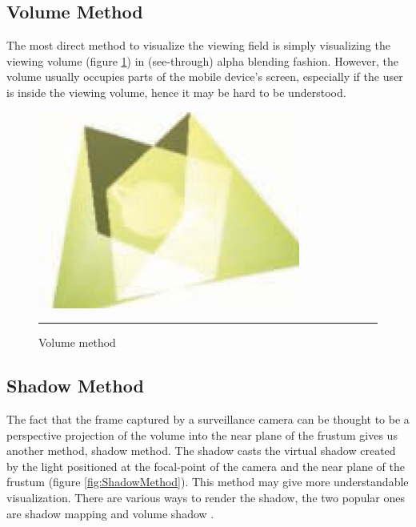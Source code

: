 \subsection{Volume Method}

The most direct method to visualize the viewing field is simply visualizing the viewing volume (figure \ref{fig:VolumeMethod}) in (see-through) alpha blending fashion. However, the volume usually occupies parts of the mobile device's screen, especially if the user is inside the viewing volume, hence it may be hard to be understood.

\begin{figure}[htbp]
	\centering
	\includegraphics{./Primitives/theory_volume.png}
	\rule{35em}{0.5pt}
	\caption[Volume method]{Volume method}
	\label{fig:VolumeMethod}
\end{figure}

\subsection{Shadow Method}
\label{ShadowMethod}

The fact that the frame captured by a surveillance camera can be thought to be a perspective projection of the volume into the near plane of the frustum gives us another method, shadow method. The shadow casts the virtual shadow created by the light positioned at the focal-point of the camera and the near plane of the frustum (figure \ref{fig:ShadowMethod}). This method may give more understandable visualization. There are various ways to render the shadow, the two popular ones are shadow mapping \cite{Reference7} \cite{Reference8} and volume shadow \cite{Reference9}.

